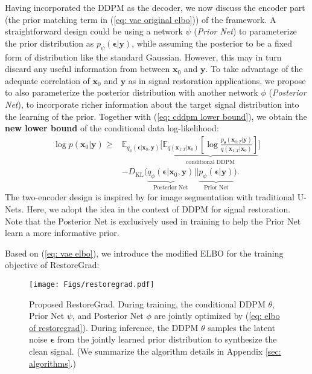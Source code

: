 Having incorporated the DDPM as the decoder, we now discuss the encoder part (the prior matching term in (\ref{eq: vae original elbo})) of the framework. A straightforward design could be using a network $\psi$ (\textit{Prior Net}) to parameterize the prior distribution as $p_\psi(\boldsymbol{\epsilon}|\mathbf{y})$, while assuming the posterior to be a fixed form of distribution like the standard Gaussian. However, this may in turn discard any useful information from between $\mathbf{x}_0$ and $\mathbf{y}$. To take advantage of the adequate correlation of $\mathbf{x}_0$ and $\mathbf{y}$ as in signal restoration applications, we propose to also parameterize the posterior distribution with another network $\phi$ (\textit{Posterior Net}), to incorporate richer information about the target signal distribution into the learning of the prior. 
Together with (\ref{eq: cddpm lower bound}), we obtain the \textbf{new lower bound} of the conditional data log-likelihood:
\begin{equation}
\begin{aligned}
    \log p(\mathbf{x}_0|\mathbf{y})\geq&\mathbb{E}_{q_\phi(\boldsymbol{\epsilon}|\mathbf{x}_0,\mathbf{y})}\Biggr[\underbrace{\mathbb{E}_{q(\mathbf{x}_{1:T}|\mathbf{x}_0)}\left[\log\frac{p_{\theta}(\mathbf{x}_{0:T}|\mathbf{y})}{q(\mathbf{x}_{1:T}|\mathbf{x}_0)}\right]}_{\text{conditional DDPM}}\Biggr] \\
    &- D_{\text{KL}}\bigr(\underbrace{q_{\phi}(\boldsymbol{\epsilon}|\mathbf{x}_0,\mathbf{y})}_{\text{Posterior Net}} || \underbrace{p_{\psi}(\boldsymbol{\epsilon}|\mathbf{y})}_{\text{Prior Net}}\bigr).
\label{eq: vae elbo}
\end{aligned}
\end{equation}
The two-encoder design is inspired by \citet{kohl2018probabilistic} for image segmentation with traditional U-Nets. Here, we adopt the idea in the context of DDPM for signal restoration. Note that the Posterior Net is exclusively used in training to help the Prior Net learn a more informative prior.

Based on (\ref{eq: vae elbo}), we introduce the modified ELBO for the training objective of RestoreGrad:

\begin{figure*}[!t]  
    \centerline{\texttt{[image: Figs/restoregrad.pdf]}}
    \vspace{-0.5cm}
    \caption{Proposed RestoreGrad. During training, the conditional DDPM $\theta$, Prior Net $\psi$, and Posterior Net $\phi$ are jointly optimized by (\ref{eq: elbo of restoregrad}). During inference, the DDPM $\theta$ samples the latent noise $\boldsymbol{\epsilon}$ from the jointly learned prior distribution to synthesize the clean signal. (We summarize the algorithm details in Appendix \ref{sec: algorithms}.)} 
\label{fig: restoregrad}
\vspace{-0.25cm}
\end{figure*} 

